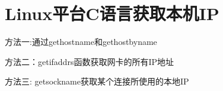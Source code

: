 \section{Linux平台C语言获取本机IP}
方法一:通过gethostname和gethostbyname

方法二：getifaddrs函数获取网卡的所有IP地址

方法三: getsockname获取某个连接所使用的本地IP

